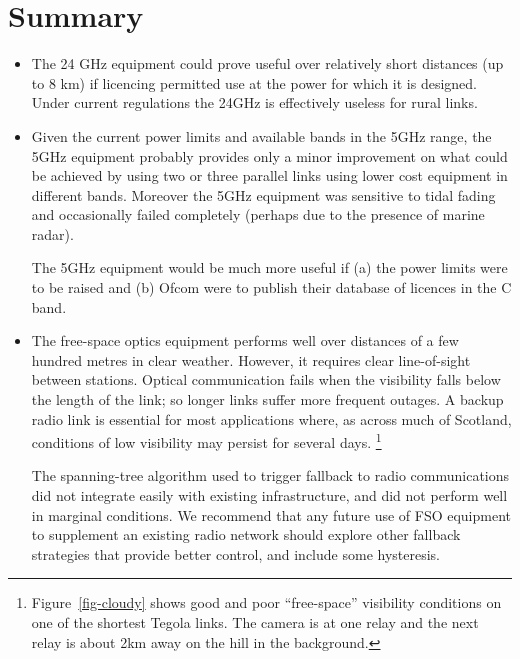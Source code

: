 \documentclass{amsart}
\begin{document}
\section{Summary}

\begin{itemize}
\item The 24 GHz equipment could prove useful over relatively short
distances (up to 8 km) if licencing permitted use at the power for
which it is designed. Under current regulations the 24GHz is
effectively useless for rural links.

\item Given the current power limits and available bands in the 
5GHz range, the 5GHz equipment probably provides only a minor
improvement on what could be achieved by using two or three parallel
links using lower cost equipment in different bands.  Moreover the 5GHz equipment
was sensitive to tidal fading and occasionally failed completely (perhaps
due to the presence of marine radar).

The 5GHz
equipment would be much more useful if (a)  the power limits were to
be raised and (b) Ofcom were to publish their database of licences in
the C band. 

\item The free-space optics equipment performs well over
  distances of a few hundred metres in clear weather. However, it
  requires clear line-of-sight between stations. Optical
  communication fails when the visibility falls below the length of
  the link; so longer links suffer more frequent outages. 
A backup radio link is essential
  for most applications where, as across much of Scotland, conditions of low visibility may persist
  for several days. 
  \footnote{Figure~\ref{fig-cloudy} shows
    good and poor ``free-space''  visibility
    conditions on one of the shortest Tegola links.  The camera is at one relay
    and the next relay is about 2km away on the hill in the
    background.}  

The spanning-tree algorithm used to trigger fallback to radio
communications did not integrate easily with existing infrastructure,
and did not perform well in marginal conditions. We recommend that any future use of FSO equipment to supplement an
existing radio network should explore other fallback strategies that
provide better control, and include some hysteresis.

\end{itemize}
\end{document}

